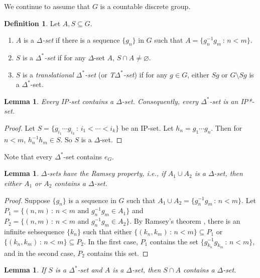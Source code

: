 \documentclass[11pt]{amsart}
\newtheorem{lemma}[theorem]{Lemma}
\theoremstyle{definition}
\newtheorem{definition}[theorem]{Definition}
\numberwithin{equation}{section}
\theoremstyle{definition}
\begin{document}
We continue to assume that $G$ is a countable discrete group.

\begin{definition} Let $A, S\subseteq G$.
\begin{enumerate}
\item $A$ is a {\em $\Delta$-set} if there is a sequence $\{g_n\}$ in $G$ such that $A=\{g_n^{-1}g_m\,:\, n<m\}$.
\item $S$ is a {\em $\Delta^*$-set} if for any $\Delta$-set $A$, $S\cap A\neq\varnothing$.
\item $S$ is a {\em translational $\Delta^*$-set} (or {\em T$\Delta^*$-set}) if for any $g\in G$, either $Sg$ or $G\setminus Sg$ is a $\Delta^*$-set.
\end{enumerate}
\end{definition}

\begin{lemma} Every IP-set contains a $\Delta$-set. Consequently, every $\Delta^*$-set is an IP*-set.
\end{lemma}

\begin{proof} Let $S=\{g_{i_1}\cdots g_{i_k}\,:\, i_1<\cdots<i_k\}$ be an IP-set. Let $h_n=g_1\cdots g_n$. Then for $n<m$, $h_n^{-1}h_m\in S$. So $S$ is a $\Delta$-set.
\end{proof}

Note that every $\Delta^*$-set contains $e_G$.

\begin{lemma}\label{lem:R} $\Delta$-sets have the Ramsey property, i.e., if $A_1\cup A_2$ is a $\Delta$-set, then either $A_1$ or $A_2$ contains a $\Delta$-set.
\end{lemma}

\begin{proof} Suppose $\{g_n\}$ is a sequence in $G$ such that $A_1\cup A_2=\{g_n^{-1}g_m\,:\, n<m\}$. Let $P_1=\{(n,m)\,:\, n<m \mbox{ and } g_n^{-1}g_m\in A_1\}$ and $P_2=\{(n,m)\,:\, n<m \mbox{ and } g_n^{-1}g_m\in A_2\}$. By Ramsey's theorem \cite[Theorem A]{Ra}, there is an infinite sebsequence $\{k_n\}$ such that either $\{(k_n,k_m)\,:\, n<m\}\subseteq P_1$ or $\{(k_n,k_m)\,:\, n<m\}\subseteq P_2$. In the first case, $P_1$ contains the set $\{g_{k_n}^{-1}g_{k_m}\,:\, n<m\}$, and in the second case, $P_2$ contains this set.
\end{proof}

\begin{lemma} If $S$ is a $\Delta^*$-set and $A$ is a $\Delta$-set, then $S\cap A$ contains a $\Delta$-set.
\end{lemma}
\end{document}
